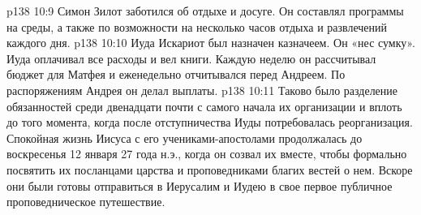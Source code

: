 \vs p138 10:9 \bibnobreakspace Симон Зилот заботился об отдыхе и досуге. Он составлял программы на среды, а также по возможности на несколько часов отдыха и развлечений каждого дня.
\vs p138 10:10 \bibnobreakspace Иуда Искариот был назначен казначеем. Он «нес сумку». Иуда оплачивал все расходы и вел книги. Каждую неделю он рассчитывал бюджет для Матфея и еженедельно отчитывался перед Андреем. По распоряжениям Андрея он делал выплаты.
\vs p138 10:11 \pc Таково было разделение обязанностей среди двенадцати почти с самого начала их организации и вплоть до того момента, когда после отступничества Иуды потребовалась реорганизация. Спокойная жизнь Иисуса с его учениками\hyp{}апостолами продолжалась до воскресенья 12 января 27 года н.э., когда он созвал их вместе, чтобы формально посвятить их посланцами царства и проповедниками благих вестей о нем. Вскоре они были готовы отправиться в Иерусалим и Иудею в свое первое публичное проповедническое путешествие.
